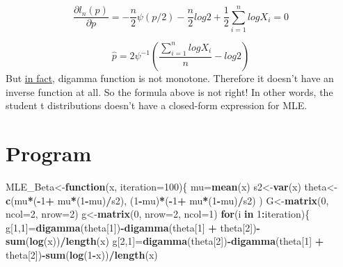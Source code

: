 \documentclass[]{article}
\newenvironment{Shaded}{\begin{snugshade}}{\end{snugshade}}
\newcommand{\ControlFlowTok}[1]{\textcolor[rgb]{0.13,0.29,0.53}{\textbf{#1}}}
\newcommand{\DataTypeTok}[1]{\textcolor[rgb]{0.13,0.29,0.53}{#1}}
\newcommand{\DecValTok}[1]{\textcolor[rgb]{0.00,0.00,0.81}{#1}}
\newcommand{\KeywordTok}[1]{\textcolor[rgb]{0.13,0.29,0.53}{\textbf{#1}}}
\newcommand{\NormalTok}[1]{#1}
\newcommand{\OperatorTok}[1]{\textcolor[rgb]{0.81,0.36,0.00}{\textbf{#1}}}
\newcommand{\StringTok}[1]{\textcolor[rgb]{0.31,0.60,0.02}{#1}}
\begin{document}
\[
\frac{\partial l_n(p)}{\partial p}=
- \frac{n}{2}\psi(p/2)-\frac{n}{2} log2+\frac{1}{2}\sum_{i=1}^n log X_i=0
\]

\[
\hat{p}=2 \psi^{-1}(\frac{\sum_{i=1}^n log X_i}{n} - log 2)
\] But \href{http://mathworld.wolfram.com/DigammaFunction.html}{in
fact}, digamma function is not monotone. Therefore it doesn't have an
inverse function at all. So the formula above is not right! In other
words, the student t distributions doesn't have a closed-form expression
for MLE.

\hypertarget{program}{%
\section{Program}\label{program}}

\begin{Shaded}
\begin{Highlighting}[]
\NormalTok{MLE_Beta<-}\ControlFlowTok{function}\NormalTok{(x, }\DataTypeTok{iteration=}\DecValTok{100}\NormalTok{)\{}
\NormalTok{  mu=}\KeywordTok{mean}\NormalTok{(x)}
\NormalTok{  s2<-}\KeywordTok{var}\NormalTok{(x)}
\NormalTok{  theta<-}\KeywordTok{c}\NormalTok{(mu}\OperatorTok{*}\NormalTok{(}\OperatorTok{-}\DecValTok{1}\OperatorTok{+}\StringTok{ }\NormalTok{mu}\OperatorTok{*}\NormalTok{(}\DecValTok{1}\OperatorTok{-}\NormalTok{mu)}\OperatorTok{/}\NormalTok{s2),}
\NormalTok{    (}\DecValTok{1}\OperatorTok{-}\NormalTok{mu)}\OperatorTok{*}\NormalTok{(}\OperatorTok{-}\DecValTok{1}\OperatorTok{+}\StringTok{ }\NormalTok{mu}\OperatorTok{*}\NormalTok{(}\DecValTok{1}\OperatorTok{-}\NormalTok{mu)}\OperatorTok{/}\NormalTok{s2)}
\NormalTok{  )}
\NormalTok{  G<-}\KeywordTok{matrix}\NormalTok{(}\DecValTok{0}\NormalTok{, }\DataTypeTok{ncol=}\DecValTok{2}\NormalTok{, }\DataTypeTok{nrow=}\DecValTok{2}\NormalTok{)}
\NormalTok{  g<-}\KeywordTok{matrix}\NormalTok{(}\DecValTok{0}\NormalTok{, }\DataTypeTok{nrow=}\DecValTok{2}\NormalTok{, }\DataTypeTok{ncol=}\DecValTok{1}\NormalTok{)}
  \ControlFlowTok{for}\NormalTok{(i }\ControlFlowTok{in} \DecValTok{1}\OperatorTok{:}\NormalTok{iteration)\{}
\NormalTok{    g[}\DecValTok{1}\NormalTok{,}\DecValTok{1}\NormalTok{]=}\KeywordTok{digamma}\NormalTok{(theta[}\DecValTok{1}\NormalTok{])}\OperatorTok{-}\KeywordTok{digamma}\NormalTok{(theta[}\DecValTok{1}\NormalTok{] }\OperatorTok{+}\StringTok{ }\NormalTok{theta[}\DecValTok{2}\NormalTok{])}\OperatorTok{-}\KeywordTok{sum}\NormalTok{(}\KeywordTok{log}\NormalTok{(x))}\OperatorTok{/}\KeywordTok{length}\NormalTok{(x)}
\NormalTok{    g[}\DecValTok{2}\NormalTok{,}\DecValTok{1}\NormalTok{]=}\KeywordTok{digamma}\NormalTok{(theta[}\DecValTok{2}\NormalTok{])}\OperatorTok{-}\KeywordTok{digamma}\NormalTok{(theta[}\DecValTok{1}\NormalTok{] }\OperatorTok{+}\StringTok{ }\NormalTok{theta[}\DecValTok{2}\NormalTok{])}\OperatorTok{-}\KeywordTok{sum}\NormalTok{(}\KeywordTok{log}\NormalTok{(}\DecValTok{1}\OperatorTok{-}\NormalTok{x))}\OperatorTok{/}\KeywordTok{length}\NormalTok{(x)}

\end{Highlighting}
\end{Shaded}
\end{document}
